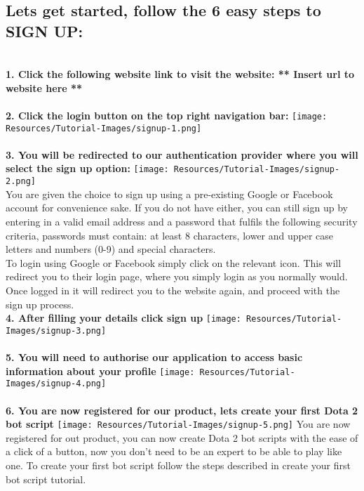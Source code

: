 \documentclass{article}
\begin{document}
\subsection*{Lets get started, follow the 6 easy steps to SIGN UP:}
\begin{flushleft}
\textbf{\\1. Click the following website link to visit the website: ** Insert url to website here **}\\
\textbf{\\2. Click the login button on the top right navigation bar:}
\texttt{[image: Resources/Tutorial-Images/signup-1.png]}\\
\textbf{\\3. You will be redirected to our authentication provider where you will select the sign up option:}
\texttt{[image: Resources/Tutorial-Images/signup-2.png]}
\\You are given the choice to sign up using a pre-existing Google or Facebook account for convenience sake. If you do not have either, you can still sign up by entering in a valid email address and a password that fulfils the following security criteria, passwords must contain: at least 8 characters, lower and upper case letters and numbers (0-9) and special characters.\\
To login using Google or Facebook simply click on the relevant icon. This will redirect you to their login page, where you simply login as you normally would. Once logged in it will redirect you to the website again, and proceed with the sign up process.
\textbf{\\4. After filling your details click sign up}
\texttt{[image: Resources/Tutorial-Images/signup-3.png]}\\
\textbf{\\5. You will need to authorise our application to access basic information about your profile}
\texttt{[image: Resources/Tutorial-Images/signup-4.png]}\\
\textbf{\\6. You are now registered for our product, lets create your first Dota 2 bot script}
\texttt{[image: Resources/Tutorial-Images/signup-5.png]}
You are now registered for out product, you can now create Dota 2 bot scripts with the ease of a click of a button, now you don't need to be an expert to be able to play like one. To create your first bot script follow the steps described in create your first bot script tutorial. 
\end{flushleft}
\end{document}
